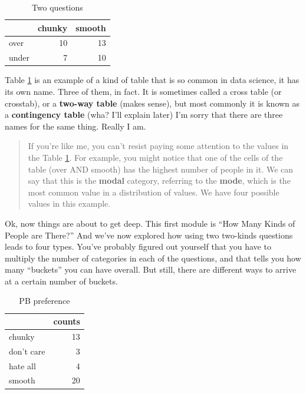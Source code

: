 \documentclass[
  openany]{book}
\begin{document}
\begin{table}[!h]

\caption{\label{tab:tpxpb}Two questions}
\centering
\begin{tabular}[t]{lrr}
\toprule
  & chunky & smooth\\
\midrule
over & 10 & 13\\
under & 7 & 10\\
\bottomrule
\end{tabular}
\end{table}

Table \ref{tab:tpxpb} is an example of a kind of table that is so common in data science, it has its own name. Three of them, in fact. It is sometimes called a cross table (or crosstab), or a \textbf{two-way table} (makes sense), but most commonly it is known as a \textbf{contingency table} (wha? I'll explain later) I'm sorry that there are three names for the same thing. Really I am.

\begin{quote}
If you're like me, you can't resist paying some attention to the values in the Table \ref{tab:tpxpb}. For example, you might notice that one of the cells of the table (over AND smooth) has the highest number of people in it. We can say that this is the \textbf{modal} category, referring to the \textbf{mode}, which is the most common value in a distribution of values. We have four possible values in this example.
\end{quote}

Ok, now things are about to get deep. This first module is ``How Many Kinds of People are There?'' And we've now explored how using two two-kinds questions leads to four types. You've probably figured out yourself that you have to multiply the number of categories in each of the questions, and that tells you how many ``buckets'' you can have overall. But still, there are different ways to arrive at a certain number of buckets.

\begin{table}[!h]

\caption{\label{tab:newpb}PB preference}
\centering
\begin{tabular}[t]{lr}
\toprule
 & counts\\
\midrule
chunky & 13\\
don't care & 3\\
hate all & 4\\
smooth & 20\\
\bottomrule
\end{tabular}
\end{table}
\end{document}
